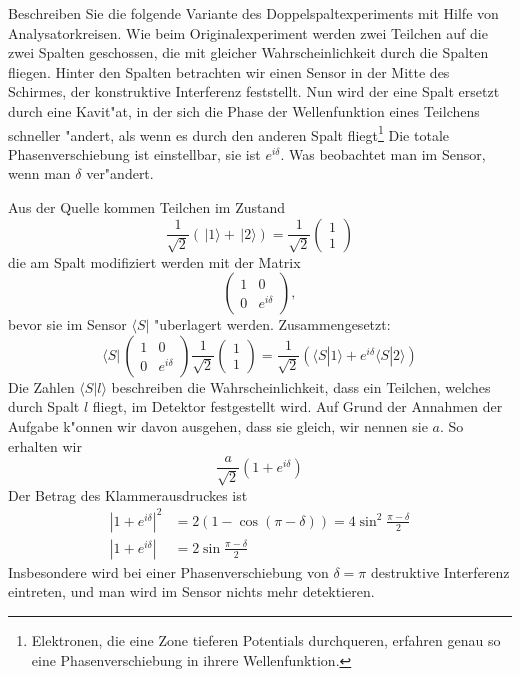 Beschreiben Sie die folgende Variante des Doppelspaltexperiments mit Hilfe 
von Analysatorkreisen.
Wie beim Originalexperiment werden zwei Teilchen auf die zwei Spalten
geschossen, die mit gleicher Wahrscheinlichkeit durch die Spalten fliegen.
Hinter den Spalten betrachten wir einen Sensor in der Mitte des Schirmes,
der konstruktive Interferenz feststellt.
Nun wird der eine Spalt ersetzt durch eine Kavit"at, in der sich die Phase
der Wellenfunktion eines Teilchens schneller "andert, als wenn es durch
den anderen Spalt fliegt\footnote{Elektronen, die eine Zone tieferen
Potentials durchqueren, erfahren genau so eine Phasenverschiebung in
ihrere Wellenfunktion.}
Die totale Phasenverschiebung ist einstellbar, sie ist $e^{i\delta}$.
Was beobachtet man im Sensor, wenn man $\delta$ ver"andert.

\begin{loesung}
Aus der Quelle kommen Teilchen im Zustand
\[
\frac1{\sqrt{2}}(\,|1\rangle+\,|2\rangle)
=
\frac1{\sqrt{2}}
\begin{pmatrix}
1\\1
\end{pmatrix}
\]
die am Spalt modifiziert werden mit der Matrix
\[
\begin{pmatrix}
1&0\\
0&e^{i\delta}
\end{pmatrix},
\]
bevor sie im Sensor $\langle S|$ "uberlagert werden.
Zusammengesetzt:
\[
\langle S|\,
\begin{pmatrix}
1&0\\
0&e^{i\delta}
\end{pmatrix}
\frac1{\sqrt{2}}
\begin{pmatrix}
1\\1
\end{pmatrix}
=
\frac1{\sqrt{2}}(
\langle S|1\rangle + e^{i\delta}\langle S|2\rangle
)
\]
Die Zahlen
$\langle S|l\rangle$
beschreiben die Wahrscheinlichkeit, dass ein Teilchen, welches durch
Spalt $l$ fliegt, im Detektor festgestellt wird.
Auf Grund der Annahmen der Aufgabe k"onnen wir davon ausgehen, dass
sie gleich, wir nennen sie $a$. So erhalten wir
\[
\frac{a}{\sqrt{2}}(1+e^{i\delta})
\]
Der Betrag des Klammerausdruckes ist
\begin{align*}
|1+e^{i\delta}|^2
&=2(1-\cos(\pi-\delta))
=4\sin^2\frac{\pi-\delta}2
\\
|1+e^{i\delta}|
&=
2\sin\frac{\pi-\delta}2
\end{align*}
Insbesondere wird bei einer Phasenverschiebung von $\delta=\pi$ 
destruktive Interferenz eintreten, und man wird im Sensor nichts
mehr detektieren.
\end{loesung}

